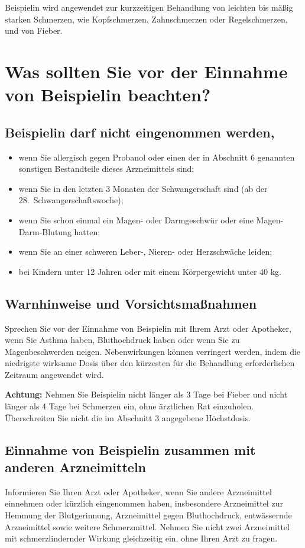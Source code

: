 \documentclass[9.5pt,a4paper]{extarticle}
\newcommand{\wichtig}[1]{\begin{tcolorbox}[colback=pharma!8, colframe=pharma, boxrule=0.6pt, arc=2pt, left=7pt, right=7pt,
  top=4pt, bottom=4pt]#1\end{tcolorbox}}
\begin{document}
Beispielin wird angewendet zur kurzzeitigen Behandlung von leichten bis mäßig starken Schmerzen, wie
Kopfschmerzen, Zahnschmerzen oder Regelschmerzen, und von Fieber.

\section{Was sollten Sie vor der Einnahme von Beispielin beachten?}
\subsection*{Beispielin darf nicht eingenommen werden,}
\begin{itemize}
  \item wenn Sie allergisch gegen Probanol oder einen der in Abschnitt 6 genannten sonstigen Bestandteile dieses
        Arzneimittels sind;
  \item wenn Sie in den letzten 3 Monaten der Schwangerschaft sind (ab der 28.\ Schwangerschaftswoche);
  \item wenn Sie schon einmal ein Magen- oder Darmgeschwür oder eine Magen-Darm-Blutung hatten;
  \item wenn Sie an einer schweren Leber-, Nieren- oder Herzschwäche leiden;
  \item bei Kindern unter 12 Jahren oder mit einem Körpergewicht unter 40 kg.
\end{itemize}

\subsection*{Warnhinweise und Vorsichtsmaßnahmen}
Sprechen Sie vor der Einnahme von Beispielin mit Ihrem Arzt oder Apotheker, wenn Sie Asthma haben, Bluthochdruck
haben oder wenn Sie zu Magenbeschwerden neigen. Nebenwirkungen können verringert werden, indem die niedrigste
wirksame Dosis über den kürzesten für die Behandlung erforderlichen Zeitraum angewendet wird.

\wichtig{\textbf{Achtung:} Nehmen Sie Beispielin nicht länger als 3 Tage bei Fieber und nicht länger als 4 Tage bei
Schmerzen ein, ohne ärztlichen Rat einzuholen. Überschreiten Sie nicht die im Abschnitt 3 angegebene Höchstdosis.}

\subsection*{Einnahme von Beispielin zusammen mit anderen Arzneimitteln}
Informieren Sie Ihren Arzt oder Apotheker, wenn Sie andere Arzneimittel einnehmen oder kürzlich eingenommen
haben, insbesondere Arzneimittel zur Hemmung der Blutgerinnung, Arzneimittel gegen Bluthochdruck, entwässernde
Arzneimittel sowie weitere Schmerzmittel. Nehmen Sie nicht zwei Arzneimittel mit schmerzlindernder Wirkung
gleichzeitig ein, ohne Ihren Arzt zu fragen.
\end{document}
